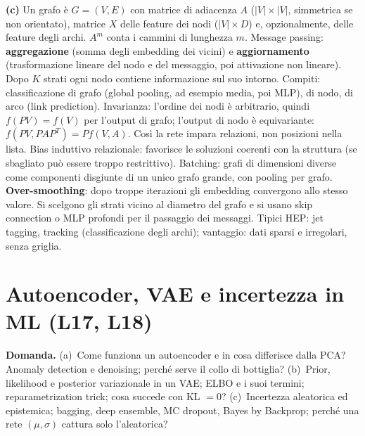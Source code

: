 \documentclass[11pt,a4paper]{article}
\newcommand{\Dom}[1]{\par\medskip\noindent\textbf{Domanda.} #1\par\nopagebreak}
\begin{document}
{\textbf{(c)} Un grafo \`e $G=(V,E)$ con matrice di adiacenza $A$ ($|V|\times|V|$, simmetrica se non orientato), matrice $X$ delle feature dei nodi ($|V|\times D$) e, opzionalmente, delle feature degli archi. $A^m$ conta i cammini di lunghezza $m$.
Message passing: \textbf{aggregazione} (somma degli embedding dei vicini) e \textbf{aggiornamento} (trasformazione lineare del nodo e del messaggio, poi attivazione non lineare). Dopo $K$ strati ogni nodo contiene informazione sul suo intorno.
Compiti: classificazione di grafo (global pooling, ad esempio media, poi MLP), di nodo, di arco (link prediction).
Invarianza: l'ordine dei nodi \`e arbitrario, quindi $f(PV)=f(V)$ per l'output di grafo; l'output di nodo \`e equivariante: $f(PV,PAP^T)=Pf(V,A)$. Cos\`i la rete impara relazioni, non posizioni nella lista.
Bias induttivo relazionale: favorisce le soluzioni coerenti con la struttura (se sbagliato pu\`o essere troppo restrittivo).
Batching: grafi di dimensioni diverse come componenti disgiunte di un unico grafo grande, con pooling per grafo.
\textbf{Over-smoothing}: dopo troppe iterazioni gli embedding convergono allo stesso valore. Si scelgono gli strati vicino al diametro del grafo e si usano skip connection o MLP profondi per il passaggio dei messaggi.
Tipici HEP: jet tagging, tracking (classificazione degli archi); vantaggio: dati sparsi e irregolari, senza griglia.
}

\section{Autoencoder, VAE e incertezza in ML (L17, L18)}

\Dom{(a)~Come funziona un autoencoder e in cosa differisce dalla PCA? Anomaly detection e denoising; perch\'e serve il collo di bottiglia?
(b)~Prior, likelihood e posterior variazionale in un VAE; ELBO e i suoi termini; reparametrization trick; cosa succede con KL $=0$?
(c)~Incertezza aleatorica ed epistemica; bagging, deep ensemble, MC dropout, Bayes by Backprop; perch\'e una rete $(\mu,\sigma)$ cattura solo l'aleatorica?}
\end{document}
